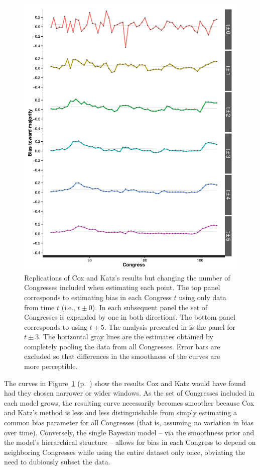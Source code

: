 \begin{figure}
\centering
\includegraphics[scale=0.75]{sections/figs/ck_hypothetical}
\caption{Replications of Cox and Katz's results but changing the number of Congresses 
included when estimating each point. The top panel corresponds to estimating bias in each 
Congress $t$ using only data from time $t$ (i.e., $t \pm 0$). In each subsequent panel the 
set of Congresses is expanded by one in both directions. The bottom panel corresponds to 
using $t \pm 5$. The analysis presented in \protect{} is the 
panel for $t \pm 3$. The horizontal gray lines are the estimates obtained by completely 
pooling the data from all Congresses. Error bars are excluded so that differences in the 
smoothness of the curves are more perceptible.}
\label{fig:ck_hypothetical}
\end{figure}


The curves in Figure~\ref{fig:ck_hypothetical} (p.~\pageref{fig:ck_hypothetical}) show the 
results Cox and Katz would have found had they chosen narrower or wider windows. As the 
set of Congresses included in each model grows, the resulting curve necessarily becomes 
smoother because Cox and Katz's method is less and less distinguishable from simply 
estimating a common bias parameter for all Congresses (that is, assuming no variation in 
bias over time). Conversely, the single Bayesian model -- via the smoothness prior and the 
model's hierarchical structure -- allows for bias in each Congress to depend on neighboring 
Congresses while using the entire dataset only once, obviating the need to dubiously subset 
the data. 



